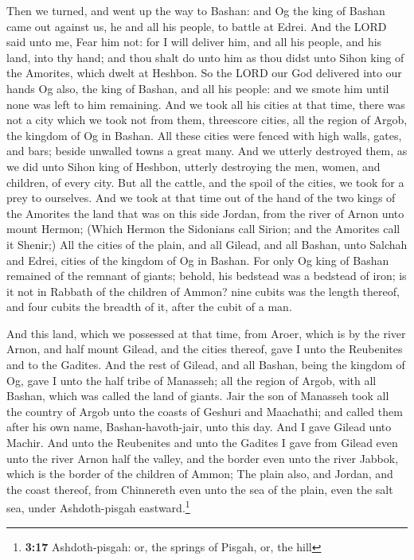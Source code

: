  Then we turned, and went up the way to Bashan: and Og the
king of Bashan came out against us, he and all his people, to battle at
Edrei.  And the LORD said unto me, Fear him not: for I
will deliver him, and all his people, and his land, into thy hand; and
thou shalt do unto him as thou didst unto Sihon king of the Amorites,
which dwelt at Heshbon.  So the LORD our God delivered
into our hands Og also, the king of Bashan, and all his people: and we
smote him until none was left to him remaining.  And we
took all his cities at that time, there was not a city which we took not
from them, threescore cities, all the region of Argob, the kingdom of Og
in Bashan.  All these cities were fenced with high walls,
gates, and bars; beside unwalled towns a great many.  And
we utterly destroyed them, as we did unto Sihon king of Heshbon, utterly
destroying the men, women, and children, of every city. 
But all the cattle, and the spoil of the cities, we took for a prey to
ourselves.  And we took at that time out of the hand of
the two kings of the Amorites the land that was on this side Jordan,
from the river of Arnon unto mount Hermon;  (Which Hermon
the Sidonians call Sirion; and the Amorites call it Shenir;)
 All the cities of the plain, and all Gilead, and all
Bashan, unto Salchah and Edrei, cities of the kingdom of Og in Bashan.
 For only Og king of Bashan remained of the remnant of
giants; behold, his bedstead was a bedstead of iron; is it not in
Rabbath of the children of Ammon? nine cubits was the length thereof,
and four cubits the breadth of it, after the cubit of a man.

 And this land, which we possessed at that time, from
Aroer, which is by the river Arnon, and half mount Gilead, and the
cities thereof, gave I unto the Reubenites and to the Gadites.
 And the rest of Gilead, and all Bashan, being the
kingdom of Og, gave I unto the half tribe of Manasseh; all the region of
Argob, with all Bashan, which was called the land of giants.
 Jair the son of Manasseh took all the country of Argob
unto the coasts of Geshuri and Maachathi; and called them after his own
name, Bashan-havoth-jair, unto this day.  And I gave
Gilead unto Machir.  And unto the Reubenites and unto the
Gadites I gave from Gilead even unto the river Arnon half the valley,
and the border even unto the river Jabbok, which is the border of the
children of Ammon;  The plain also, and Jordan, and the
coast thereof, from Chinnereth even unto the sea of the plain, even the
salt sea, under Ashdoth-pisgah eastward.\footnote{\textbf{3:17}
  Ashdoth-pisgah: or, the springs of Pisgah, or, the hill}

